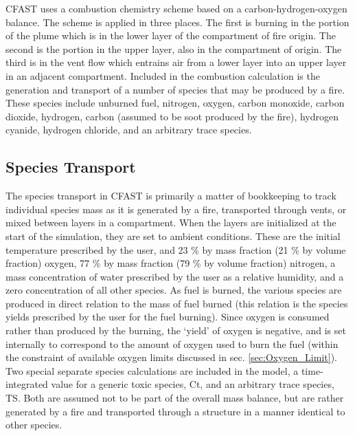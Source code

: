 CFAST uses a combustion chemistry scheme based on a carbon-hydrogen-oxygen balance.  The scheme is applied in three places.  The first is burning in the portion of the plume which is in the lower layer of the compartment of fire origin.  The second is the portion in the upper layer, also in the compartment of origin.  The third is in the vent flow which entrains air from a lower layer into an upper layer in an adjacent compartment.  Included in the combustion calculation is the generation and transport of a number of species that may be produced by a fire.  These species include unburned fuel, nitrogen, oxygen, carbon monoxide, carbon dioxide, hydrogen, carbon (assumed to be soot produced by the fire), hydrogen cyanide, hydrogen chloride, and an arbitrary trace species.

\subsection{Species Transport}

The species transport in CFAST is primarily a matter of bookkeeping to track individual species mass as it is generated by a fire, transported through vents, or mixed between layers in a compartment.  When the layers are initialized at the start of the simulation, they are set to ambient conditions.  These are the initial temperature prescribed by the user, and 23 \% by mass fraction (21 \% by volume fraction) oxygen, 77 \% by mass fraction (79 \% by volume fraction) nitrogen, a mass concentration of water prescribed by the user as a relative humidity, and a zero concentration of all other species.  As fuel is burned, the various species are produced in direct relation to the mass of fuel burned (this relation is the species yields prescribed by the user for the fuel burning).  Since oxygen is consumed rather than produced by the burning, the `yield' of oxygen is negative, and is set internally to correspond to the amount of oxygen used to burn the fuel (within the constraint of available oxygen limits discussed in sec. \ref{sec:Oxygen_Limit}). Two special separate species calculations are included in the model, a time-integrated value for a generic toxic species, Ct, and an arbitrary trace species, TS.  Both are assumed not to be part of the overall mass balance, but are rather generated by a fire and transported through a structure in a manner identical to other species.

